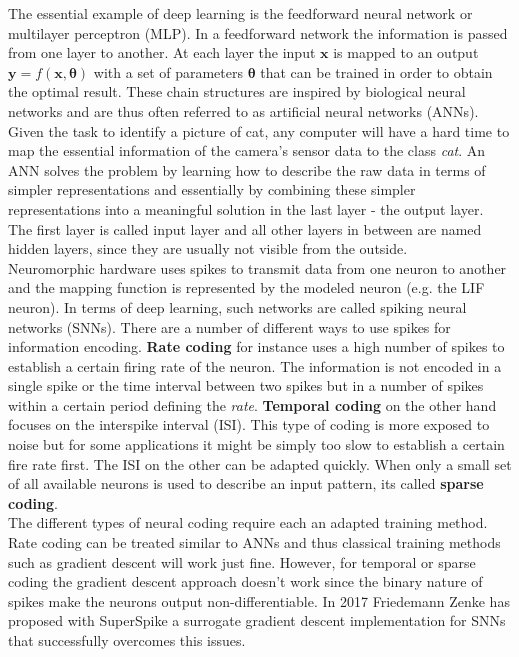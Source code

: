 The essential example of deep learning is the feedforward neural network or multilayer perceptron (MLP). In a feedforward network the information is passed from one layer to another. At each layer the input $\mathbf{x}$ is mapped to an output $\mathbf{y} = f(\mathbf{x, \theta})$ with a set of parameters $\mathbf{\theta}$ that can be trained in order to obtain the optimal result. These chain structures are inspired by biological neural networks and are thus often referred to as artificial neural networks (ANNs).\\

Given the task to identify a picture of cat, any computer will have a hard time to map the essential information of the camera's sensor data to the class \textit{cat}. An ANN solves the problem by learning how to describe the raw data in terms of simpler representations and essentially by combining these simpler representations into a meaningful solution in the last layer - the output layer. The first layer is called input layer and all other layers in between are named hidden layers, since they are usually not visible from the outside.\\

Neuromorphic hardware uses spikes to transmit data from one neuron to another and the mapping function is represented by the modeled neuron (e.g. the LIF neuron). In terms of deep learning, such networks are called spiking neural networks (SNNs). There are a number of different ways to use spikes for information encoding. \textbf{Rate coding} for instance uses a high number of spikes to establish a certain firing rate of the neuron. The information is not encoded in a single spike or the time interval between two spikes but in a number of spikes within a certain period defining the \textit{rate}. \textbf{Temporal coding} on the other hand focuses on the interspike interval (ISI). This type of coding is more exposed to noise but for some applications it might be simply too slow to establish a certain fire rate first. The ISI on the other can be adapted quickly. When only a small set of all available neurons is used to describe an input pattern, its called \textbf{sparse coding}.\\

The different types of neural coding require each an adapted training method. Rate coding can be treated similar to ANNs and thus classical training methods such as gradient descent will work just fine. However, for temporal or sparse coding the gradient descent approach doesn't work since the binary nature of spikes make the neurons output non-differentiable. In 2017 Friedemann Zenke has proposed with SuperSpike a surrogate gradient descent implementation for SNNs that successfully overcomes this issues. 

